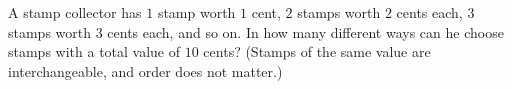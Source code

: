 A stamp collector has $1$ stamp worth $1$ cent, $2$ stamps worth $2$ cents each, $3$ stamps worth $3$ cents each, and so on. In how many different ways can he choose stamps with a total value of $10$ cents? (Stamps of the same value are interchangeable, and order does not matter.)

